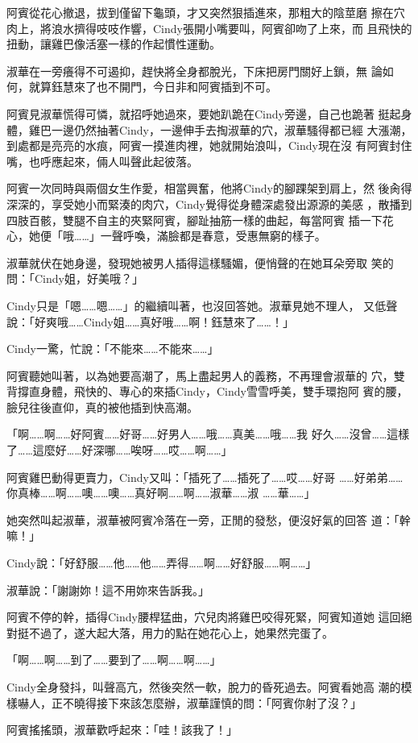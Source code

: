 阿賓從花心撤退，拔到僅留下龜頭，才又突然狠插進來，那粗大的陰莖磨
擦在穴肉上，將浪水擠得吱吱作響，Cindy張開小嘴要叫，阿賓卻吻了上來，而
且飛快的扭動，讓雞巴像活塞一樣的作起慣性運動。

淑華在一旁癢得不可遏抑，趕快將全身都脫光，下床把房門關好上鎖，無
論如何，就算鈺慧來了也不開門，今日非和阿賓插到不可。

阿賓見淑華慌得可憐，就招呼她過來，要她趴跪在Cindy旁邊，自己也跪著
挺起身體，雞巴一邊仍然抽著Cindy，一邊伸手去掏淑華的穴，淑華騷得都已經
大漲潮，到處都是亮亮的水痕，阿賓一摸進肉裡，她就開始浪叫，Cindy現在沒
有阿賓封住嘴，也呼應起來，倆人叫聲此起彼落。

阿賓一次同時與兩個女生作愛，相當興奮，他將Cindy的腳踝架到肩上，然
後肏得深深的，享受她小而緊湊的肉穴，Cindy覺得從身體深處發出源源的美感
，散播到四肢百骸，雙腿不自主的夾緊阿賓，腳趾抽筋一樣的曲起，每當阿賓
插一下花心，她便「哦……」一聲呼喚，滿臉都是春意，受惠無窮的樣子。

淑華就伏在她身邊，發現她被男人插得這樣騷媚，便悄聲的在她耳朵旁取
笑的問：「Cindy姐，好美哦？」

Cindy只是「嗯……嗯……」的繼續叫著，也沒回答她。淑華見她不理人，
又低聲說：「好爽哦……Cindy姐……真好哦……啊！鈺慧來了……！」

Cindy一驚，忙說：「不能來……不能來……」

阿賓聽她叫著，以為她要高潮了，馬上盡起男人的義務，不再理會淑華的
穴，雙背撐直身體，飛快的、專心的來插Cindy，Cindy雪雪呼美，雙手環抱阿
賓的腰，臉兒往後直仰，真的被他插到快高潮。

「啊……啊……好阿賓……好哥……好男人……哦……真美……哦……我
好久……沒曾……這樣了……這麼好……好深哪……唉呀……哎……啊……」

阿賓雞巴動得更賣力，Cindy又叫：「插死了……插死了……哎……好哥
……好弟弟……你真棒……啊……噢……噢……真好啊……啊……淑華……淑
……華……」

她突然叫起淑華，淑華被阿賓冷落在一旁，正閒的發愁，便沒好氣的回答
道：「幹嘛！」

Cindy說：「好舒服……他……他……弄得……啊……好舒服……啊……」

淑華說：「謝謝妳！這不用妳來告訴我。」

阿賓不停的幹，插得Cindy腰桿猛曲，穴兒肉將雞巴咬得死緊，阿賓知道她
這回絕對挺不過了，遂大起大落，用力的點在她花心上，她果然完蛋了。

「啊……啊……到了……要到了……啊……啊……」

Cindy全身發抖，叫聲高亢，然後突然一軟，脫力的昏死過去。阿賓看她高
潮的模樣嚇人，正不曉得接下來該怎麼辦，淑華謹慎的問：「阿賓你射了沒？」

阿賓搖搖頭，淑華歡呼起來：「哇！該我了！」


